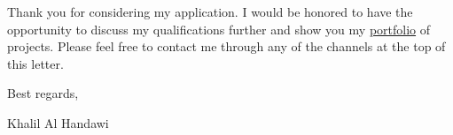 \documentclass[12pt]{article} %
\begin{document}
\medskip %

Thank you for considering my application. I would be honored to have the opportunity to discuss my qualifications further and show you my \href{https://khbalhandawi.github.io/projects/}{portfolio} of projects. Please feel free to contact me through any of the channels at the top of this letter.

\medskip %

Best regards,

\medskip %


Khalil Al Handawi


\medskip %

\end{document}
